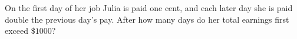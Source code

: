 On the first day of her job Julia is paid one cent, and each later day she is paid double the previous day's pay. After how many days do her total earnings first exceed $\$1000$?
